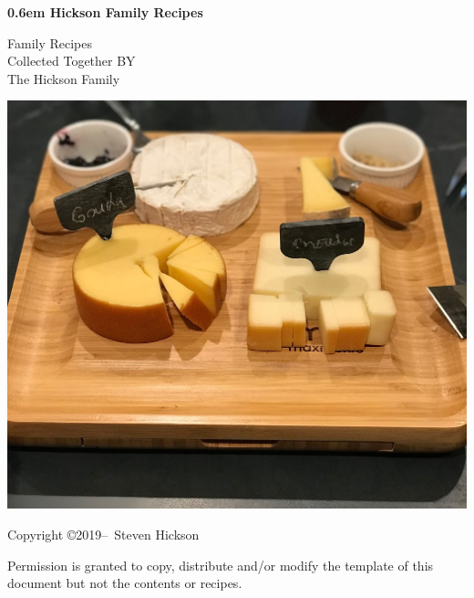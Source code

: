 \documentclass[11pt]{report}
\newcommand\nbvspace[1][3]{\vspace*{\stretch{#1}}}
\newcommand{\nbtitlestretch}{\spaceskip0.6em}
\begin{document}

\begin{titlepage}
\begin{center}
\bfseries
\nbvspace[1]
\Huge
{\nbtitlestretch\huge
Hickson Family Recipes}

\nbvspace[1]
\normalsize

Family Recipes\\
Collected Together
\nbvspace[1]
\small BY\\
\Large The Hickson Family\\[0.5em]

\nbvspace[2]

\includegraphics[width=6in]{images/IMG_0506.jpg}
\nbvspace[3]
\normalsize

\nbvspace[1]
\end{center}
\end{titlepage}

\clearpage\null\vfill
\pagestyle{empty}
\begin{minipage}[b]{0.9\textwidth}
\footnotesize\raggedright
\setlength{\parskip}{0.5\baselineskip}
Copyright \copyright 2019--\the\year\ Steven Hickson\par
Permission is granted to copy, distribute and\slash or modify 
the template of this document but not the contents or recipes. 
\end{minipage}
\vspace*{2\baselineskip}
\cleardoublepage
\rfoot{\thepage}
\end{document}
